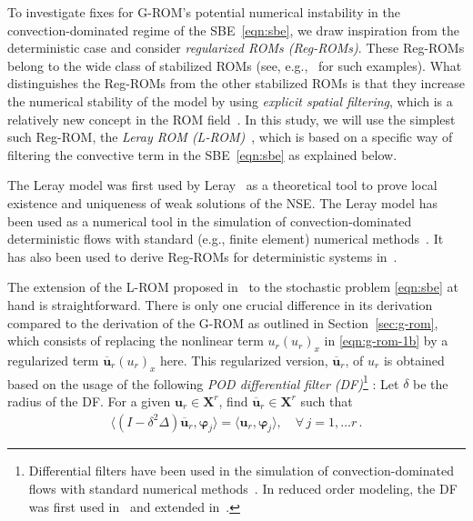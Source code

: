 \documentclass[11pt]{amsart}
\numberwithin{equation}{section}
\newcommand{\bu}{\boldsymbol{u}}
\newcommand{\obu}{\overline{\boldsymbol u}}
\newcommand{\bX}{\boldsymbol{X}}
\newcommand{\bphi}{\boldsymbol{\varphi}}
\begin{document}
To investigate fixes for G-ROM's potential numerical instability in the convection-dominated regime of the SBE~\eqref{eqn:sbe}, we draw inspiration from the deterministic case and consider {\it regularized ROMs (Reg-ROMs)}. 
These Reg-ROMs belong to the wide class of stabilized ROMs (see, e.g.,~\cite{amsallem2012stabilization,AHLS88,balajewicz2013low,ballarin2015supremizer,barone2009stable,bergmann2009enablers,carlberg2013gnat,cordier2010calibration,giere2015supg,HLB96,kalashnikova2010stability,noack2011reduced,pacciarini2014stabilized,quarteroni2011certified,wang2012proper,xiao2014non} for such examples).
What distinguishes the Reg-ROMs from the other stabilized ROMs is that they increase the numerical stability of the model by using {\it explicit spatial filtering}, which is a relatively new concept in the ROM field~\cite{wang2012proper,sabetghadam2012alpha,wells2016regularized}.
In this study, we will use the simplest such Reg-ROM, the {\it Leray ROM (L-ROM)}~\cite{sabetghadam2012alpha,wells2016regularized}, which is based on a specific way of filtering the convective term in the SBE~\eqref{eqn:sbe} as explained below.



The Leray model was first used by Leray~\cite{leray1934sur} as a theoretical tool to prove local existence and uniqueness of weak solutions of the NSE.
The Leray model has been used as a numerical tool in the simulation of convection-dominated deterministic flows with standard (e.g., finite element) numerical methods~\cite{cheskidov2005leray,geurts2003regularization,layton2012approximate}. 
It has also been used to derive Reg-ROMs for deterministic systems in~\cite{sabetghadam2012alpha,wells2016regularized}.

The extension of the L-ROM proposed in~\cite{sabetghadam2012alpha,wells2016regularized} to the stochastic problem \eqref{eqn:sbe} at hand is straightforward. There is only one crucial difference in its derivation compared to the derivation of the G-ROM as outlined in Section~\ref{sec:g-rom}, which consists of replacing the nonlinear term $u_r (u_r)_x$ in \eqref{eqn:g-rom-1b} by a regularized term $\obu_r (u_r)_x$ here. This regularized version, $\obu_r$, of $u_r$ is obtained based on the usage of the following {\it POD differential filter (DF)}\footnote{Differential filters have been used in the simulation of convection-dominated flows with standard numerical methods~\cite{germano1986differential-b,germano1986differential}. 
In reduced order modeling, the DF was first used in~\cite{sabetghadam2012alpha} and extended in~\cite{wells2016regularized}.} : Let $\delta$ be the radius of the DF. For a given $\bu_r \in \bX^r$, find $\obu_r \in \bX^r$ such that
\begin{eqnarray}
	\big \langle
		\left(
			I - \delta^2 \Delta
		\right) \obu_r , \bphi_j
	\big \rangle
	= \langle \bu_r, \bphi_j\rangle,
	\quad \forall \, j=1, \ldots r \, .
	\label{eqn:df}
\end{eqnarray}
\end{document}
